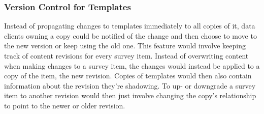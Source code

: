 		\subsubsection{Version Control for Templates}
			Instead of propagating changes to templates immediately
			to all copies of it, data clients owning a copy
			could be notified of the change and then choose to
			move to the new version or keep using the old one.
			This feature would involve keeping track of
			content revisions for every survey item.
			Instead of overwriting content when making changes
			to a survey item, the changes would instead be
			applied to a copy of the item, the new revision.
			Copies of templates would then also contain information
			about the revision they're shadowing. 
			To up- or downgrade a survey item to another revision
			would then just involve changing the copy's
			 relationship to point to the newer
			or older revision.